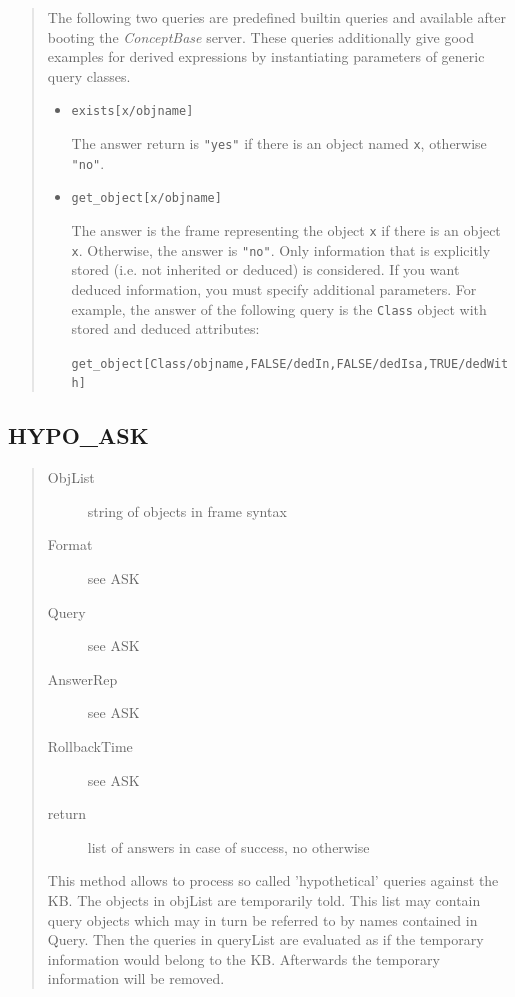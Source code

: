 \begin{quote}
The following two queries are predefined builtin queries and
available after booting the {\it ConceptBase\/} server. These queries
additionally give good examples for derived expressions by
instantiating parameters of generic query classes.

\begin{itemize}
\item \verb+exists[x/objname]+

  The answer return is \verb+"yes"+ if there is an object named {\tt x},
  otherwise \verb+"no"+.

\item \verb+get_object[x/objname]+

  The answer is the frame representing the object {\tt x} if
  there is an object {\tt x}. Otherwise, the answer is \verb+"no"+. Only
  information that is explicitly stored (i.e. not inherited or
  deduced) is considered. If you want deduced information, you must specify
  additional parameters. For example, the answer of the following query
  is the {\tt Class} object with stored and deduced attributes:
  \begin{center}
  \verb+get_object[Class/objname,FALSE/dedIn,FALSE/dedIsa,TRUE/dedWith]+
  \end{center}

\end{itemize}
\end{quote}

\subsection{HYPO\_ASK}


\begin{quote}
\begin{description}
\item[ObjList] string of objects in frame syntax
\item[Format] see ASK
\item[Query] see ASK
\item[AnswerRep] see ASK
\item[RollbackTime] see ASK
\item[return] list of answers in case of success, no otherwise
\end{description}


This method allows to process so called 'hypothetical' queries
against the KB. The objects in objList are temporarily told.
This list may contain query objects which may in turn be
referred to by names contained in Query.  Then the queries in
queryList are evaluated as if the temporary information would
belong to the KB. Afterwards the temporary information will be
removed.
\end{quote}

